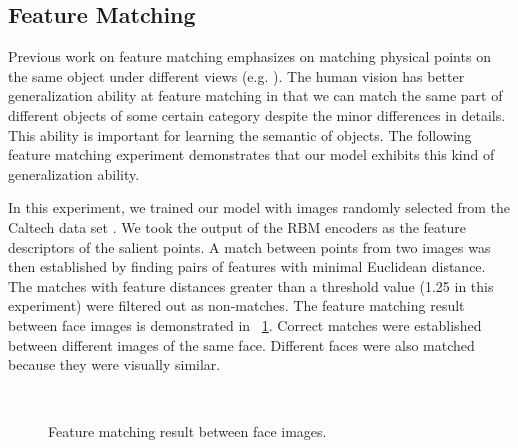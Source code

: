 \documentclass[conference]{IEEEtran}
\begin{document}
\subsection{Feature Matching}

Previous work on feature matching emphasizes on matching 
physical points on the same object under different views (e.g. \cite{brown2011}).
The human vision has better generalization ability at feature matching
in that we can match the same part of different objects of some certain category
despite the minor differences in details.
This ability is important for learning the semantic of objects.
The following feature matching experiment demonstrates
that our model exhibits this kind of generalization ability.

In this experiment, we trained our model 
with images randomly selected from the Caltech data set \cite{fei2007}.
We took the output of the RBM encoders as the feature descriptors of the salient points.
A match between points from two images was then established by finding pairs of features
with minimal Euclidean distance.
The matches with feature distances greater than a threshold value (1.25 in this experiment)
were filtered out as non-matches.
The feature matching result between face images is demonstrated in \figurename~\ref{fig:13}.
Correct matches were established between different images of the same face.
Different faces were also matched because they were visually similar.

\begin{figure}[htp]
\centering
{}\\
\caption{Feature matching result between face images.}
\label{fig:13}
\end{figure}
\end{document}
